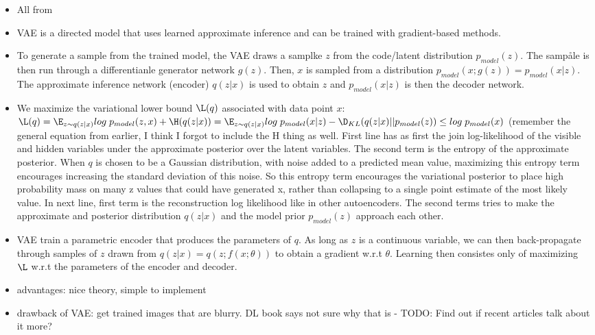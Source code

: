 \begin{itemize}
    \item All from \cite[Chp.~20]{Goodfellow-et-al-2016}
    \item VAE is a directed model that uses learned approximate inference and can be trained with gradient-based methods.
    \item To generate a sample from the trained model, the VAE draws a samplke $z$ from the code/latent distribution $p_{model}(z)$. The sampåle is then run through a differentianle generator network $g(z)$. Then, $x$ is sampled from a distribution $p_{model}(x;g(z)) = p_{model}(x|z)$. The approximate inference network (encoder) $q(z|x)$ is used to obtain $z$ and $p_{model}(x|z)$ is then the decoder network.
    \item We maximize the variational lower bound $\L(q)$ associated with data point $x$: $\L(q) = \E_{z \sim q(z|x)} log \; p_{model}(z,x) + \H(q(z|x)) = \E_{z \sim q(z|x)}log \; p_{model}(x|z) - \D_{KL}(q(z|x)||p_{model}(z)) \leq log\; p_{model}(x)$ (remember the general equation from earlier, I think I forgot to include the H thing as well. First line has as first the join log-likelihood of the visible and hidden variables under the approximate posterior over the latent variables. The second term is the entropy of the approximate posterior. When $q$ is chosen to be a Gaussian distribution, with noise added to a predicted mean value, maximizing this entropy term encourages increasing the standard deviation of this noise. So this entropy term encourages the variational posterior to place high probability mass on many z values that could have generated x, rather than collapsing to a single point estimate of the most likely value. In next line, first term is the reconstruction log likelihood like in other autoencoders. The second terms tries to make the approximate and posterior distribution $q(z|x)$ and the model prior $p_{model}(z)$ approach each other.
    \item VAE train a parametric encoder that produces the parameters of $q$. As long as $z$ is a continuous variable, we can then back-propagate through samples of $z$ drawn from $q(z|x)=q(z;f(x;\theta))$ to obtain a gradient w.r.t $\theta$. Learning then consistes only of maximizing $\L$ w.r.t the parameters of the encoder and decoder.
    \item advantages: nice theory, simple to implement
    \item drawback of VAE: get trained images that are blurry. DL book says not sure why that is - TODO: Find out if recent articles talk about it more?

\end{itemize}
